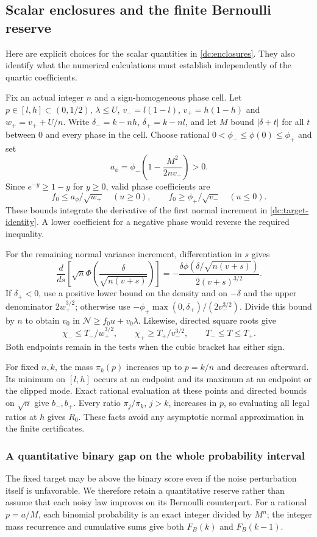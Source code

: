 \subsection{Scalar enclosures and the finite Bernoulli reserve}
\label{dc:normalization}
Here are explicit choices for the scalar quantities in
\eqref{dc:enclosures}. They also identify what the numerical calculations
must establish independently of the quartic coefficients.

Fix an actual integer $n$ and a sign-homogeneous phase cell. Let
$p\in[l,h]\subset(0,1/2)$, $\lambda\le U$, $v_-=l(1-l)$,
$v_+=h(1-h)$ and $w_+=v_++U/n$. Write
$\delta_-=k-nh$, $\delta_+=k-nl$, and let $M$ bound
$|\delta+t|$ for all $t$ between $0$ and every phase in the cell.
Choose rational $0<\phi_-\le\phi(0)\le\phi_+$ and set
\[
 a_\phi=\phi_-\left(1-\frac{M^2}{2nv_-}\right)>0.
\]
Since $e^{-y}\ge1-y$ for $y\ge0$, valid phase coefficients are
\begin{equation}\label{dc:phase-coeff}
 f_0\le a_\phi/\sqrt{w_+}\quad(u\ge0),\qquad
 f_0\ge\phi_+/\sqrt{v_-}\quad(u\le0).
\end{equation}
These bounds integrate the derivative of the first normal increment
in \eqref{dc:target-identity}. A lower coefficient for a negative phase
would reverse the required inequality.

For the remaining normal variance increment, differentiation in $s$ gives
\[
 \frac{d}{ds}\left[\sqrt n\Phi\left(\frac\delta{\sqrt{n(v+s)}}\right)\right]
       =-\frac{\delta\phi(\delta/\sqrt{n(v+s)})}{2(v+s)^{3/2}}.
\]
If $\delta_+<0$, use a positive lower bound on the density and on
$-\delta$ and the upper denominator $2w_+^{3/2}$; otherwise use
$-\phi_+\max(0,\delta_+)/(2v_-^{3/2})$.
Divide this bound by $n$ to obtain $v_0$ in
$\mathcal N\ge f_0u+v_0\lambda$.
Likewise, directed square roots give
\[
 \chi_-\le T_-/w_+^{3/2},\qquad \chi_+\ge T_+/v_-^{3/2},
 \qquad T_-\le T\le T_+.
\]
Both endpoints remain in the tests when the cubic bracket has either sign.

For fixed $n,k$, the mass $\pi_k(p)$ increases up to $p=k/n$ and decreases
afterward. Its minimum on $[l,h]$ occurs at an endpoint and its maximum at
an endpoint or the clipped mode. Exact rational evaluation at these points
and directed bounds on $\sqrt n$ give $b_-,b_+$.
Every ratio $\pi_j/\pi_k$, $j>k$, increases in $p$, so evaluating all legal
ratios at $h$ gives $R_0$. These facts avoid any asymptotic normal
approximation in the finite certificates.

\subsubsection{A quantitative binary gap on the whole probability interval}
\label{dc:binary}
The fixed target may be above the binary score even if the noise
perturbation itself is unfavorable. We therefore retain a quantitative
reserve rather than assume that each noisy law improves on its Bernoulli
counterpart. For a rational $p=a/M$, each binomial probability is an exact
integer divided by $M^n$; the integer mass recurrence and cumulative sums
give both $F_B(k)$ and $F_B(k-1)$.

